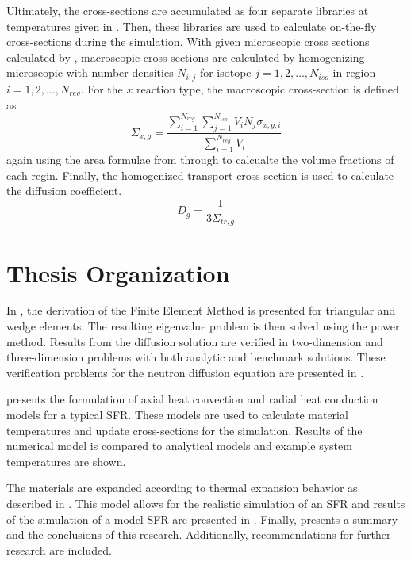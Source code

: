   Ultimately, the cross-sections are accumulated as four separate libraries at
  temperatures given in . Then, these libraries are used to
  calculate on-the-fly cross-sections during the simulation.
  With given microscopic cross sections calculated by \mcc, macroscopic cross
  sections are calculated by homogenizing microscopic with number densities
  $N_{i,j}$ for isotope ${j=1,2,\ldots,N_{iso}}$ in region
  ${i=1,2,\ldots,N_{reg}}$.  For the $x$ reaction type, the 
  macroscopic cross-section is defined as
  \begin{equation}
    \Sigma_{x,g} = \frac{\sum_{i=1}^{N_{reg}} \sum_{j=1}^{N_{iso}} V_i N_{j} 
      \sigma_{x,g,i}} {\sum_{i=1}^{N_{reg}}V_i}
  \end{equation}
  again using the area formulae from  through
   to calcualte the volume fractions of each regin.
  Finally, the homogenized transport cross section is used to calculate the 
  diffusion coefficient.
  \begin{equation}
    D_g = \frac{1}{3 \Sigma_{tr,g}}
  \end{equation}

\section{Thesis Organization}
  In , the derivation of the Finite Element Method is
  presented for triangular and wedge elements. The resulting eigenvalue problem
  is then solved using the power method. Results from the diffusion solution are
  verified in two-dimension and three-dimension problems with both analytic and
  benchmark solutions. These verification problems for the neutron diffusion
  equation are presented in .

   presents the formulation of axial heat convection
  and radial heat conduction models for a typical SFR. These models are used to
  calculate material temperatures and update cross-sections for the simulation.
  Results of the numerical model is compared to analytical models and example
  system temperatures are shown.

  The materials are expanded according to thermal expansion behavior as
  described in . This model allows for the realistic
  simulation of an SFR and results of the simulation of a model SFR are presented
  in . Finally,  presents a 
  summary and the conclusions of this research. Additionally, recommendations 
  for further research are included.

